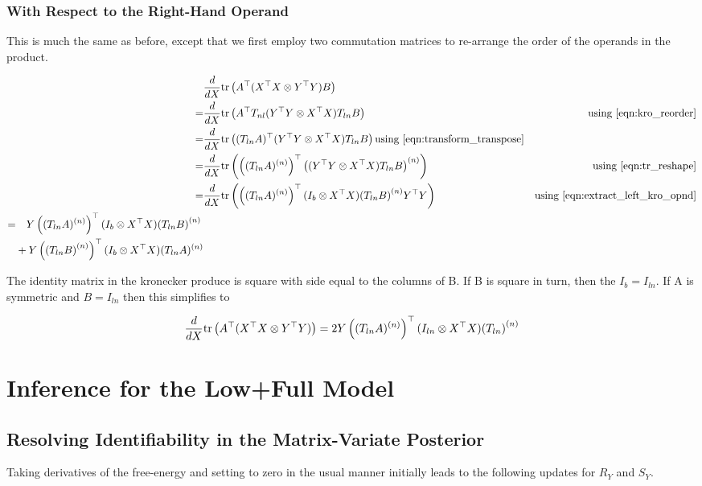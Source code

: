 \documentclass[10pt,fleqn]{article}
\newcommand \tr { \text{tr} }
\newcommand \T { ^\top }
\newcommand \Tr[1]   { \tr \left(  {#1}  \right) }
\newcommand \vt[2] { { #1^{(#2)} } }
\begin{document}
\begin{appendices}
\subsubsection{With Respect to the Right-Hand Operand}
This is much the same as before, except that we first employ two commutation matrices to re-arrange the order of the operands in the product.

\begin{align}
  & \ddX \Tr{A\T (X\T X \otimes Y\T Y ) B} \\
= & \ddX \Tr{A\T T_{nl} (Y\T Y \otimes X\T X ) T_{ln} B} & \text{using }\eqref{eqn:kro_reorder} \\
= & \ddX \Tr{ (T_{ln} A)\T (Y\T Y \otimes X\T X ) T_{ln} B} \text{using }\eqref{eqn:transform_transpose} \\
= & \ddX \Tr{\left(\vt{(T_{ln} A)}{n}\right)\T \vt{\left( (Y\T Y \otimes X\T X ) T_{ln}B \right)}{n}} & \text{using } \eqref{eqn:tr_reshape} \\
= & \ddX \Tr{\left(\vt{(T_{ln} A)}{n}\right)\T (I_b \otimes X\T X ) \vt{\left( T_{ln}B \right)}{n} Y\T Y } & \text{using } \eqref{eqn:extract_left_kro_opnd} \\
\begin{split}
= & \quad Y \left(\vt{(T_{ln} A)}{n}\right)\T (I_b \otimes X\T X ) \vt{\left( T_{ln}B \right)}{n} \\
  & + Y \left(\vt{\left( T_{ln}B \right)}{n}\right)\T (I_b \otimes X\T X ) \vt{(T_{ln} A)}{n} \label{eqn:rhs_kro_derivative}
\end{split}
\end{align}

The identity matrix in the kronecker produce is square with side equal to the columns of B. If B is square in turn, then the $I_b = I_{ln}$. If A is symmetric and $B = I_{ln}$ then this simplifies to

\begin{equation}
\ddX \Tr{A\T (X\T X \otimes Y\T Y )} = 2 Y \left(\vt{(T_{ln} A)}{n}\right)\T (I_{ln} \otimes X\T X ) \vt{\left( T_{ln} \right)}{n} \label{eqn:rhs_kro_derivative_B_is_ident}
\end{equation}



\section{Inference for the Low+Full Model}
\subsection{Resolving Identifiability in the Matrix-Variate Posterior}
\label{sec:trace-trick}
Taking derivatives of the free-energy and setting to zero in the usual manner initially leads to the following updates for $R_Y$ and $S_Y$.


\end{appendices}
\end{document}
